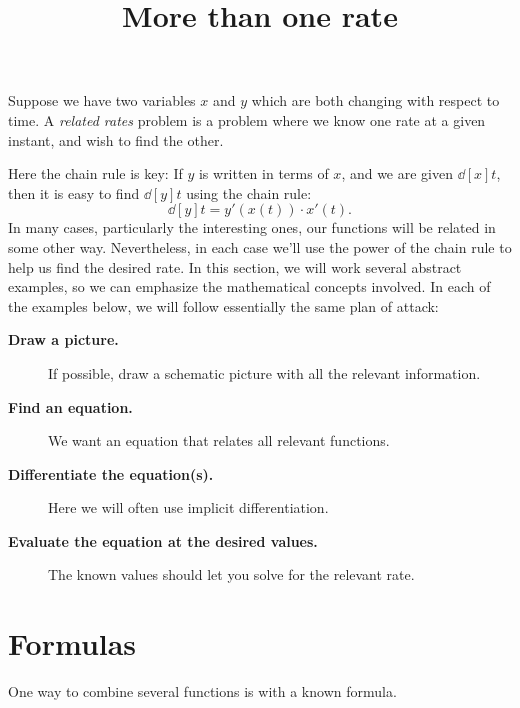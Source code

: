 \documentclass{ximera}
\title[Dig-In:]{More than one rate}
\begin{document}
\begin{abstract}
\end{abstract}
\maketitle


Suppose we have two variables $x$ and $y$ which are both changing with
respect to time.  A \textit{related rates} problem is a problem where
we know one rate at a given instant, and wish to find the other.

Here the chain rule is key: If $y$ is written in terms of $x$, and we
are given $\dd[x]{t}$, then it is easy to find $\dd[y]{t}$ using the
chain rule:
\[
\dd[y]{t}=y'(x(t))\cdot x'(t).
\]
In many cases, particularly the interesting ones, our functions will
be related in some other way. Nevertheless, in each case we'll use the
power of the chain rule to help us find the desired rate. In this
section, we will work several abstract examples, so we can emphasize
the mathematical concepts involved. In each of the examples below, we will follow essentially the same plan of attack:

\begin{description}
\item[\textbf{Draw a picture.}] If possible, draw a schematic picture with all the relevant information. 
\item[\textbf{Find an equation.}] We want an equation that relates all
  relevant functions.
\item[\textbf{Differentiate the equation(s).}] Here we will often use
  implicit differentiation.
\item[\textbf{Evaluate the equation at the desired values.}] The known
  values should let you solve for the relevant rate.
\end{description}


\section{Formulas}

One way to combine several functions is with a known formula.
\end{document}
